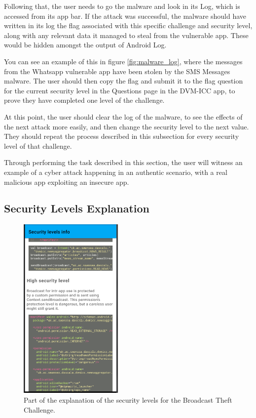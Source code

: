     Following that, the user needs to go the malware and look in its Log, which is accessed from its app bar. If the attack was successful, the malware should have written in its log the flag associated with this specific challenge and security level, along with any relevant data it managed to steal from the vulnerable app. These would be hidden amongst the output of Android Log. 
    
    You can see an example of this in figure \ref{fig:malware_log}, where the messages from the Whatsapp vulnerable app have been stolen by the SMS Messages malware. The user should then copy the flag and submit it to the flag question for the current security level in the Questions page in the DVM-ICC app, to prove they have completed one level of the challenge. 
    
    At this point, the user should clear the log of the malware, to see the effects of the next attack more easily, and then change the security level to the next value. They should repeat the process described in this subsection for every security level of that challenge.
    
    Through performing the task described in this section, the user will witness an example of a cyber attack happening in an authentic scenario, with a real malicious app exploiting an insecure app. 
    
    \subsection{Security Levels Explanation}
        \label{subsec:security_levels_explanation}
        
    \begin{figure}
        \centering
        \includegraphics[width=0.45\textwidth]{graphics/security_level_explanation.PNG}
        \caption{Part of the explanation of the security levels for the Broadcast Theft Challenge.}
        \label{fig:security_levels}
    \end{figure}
        
